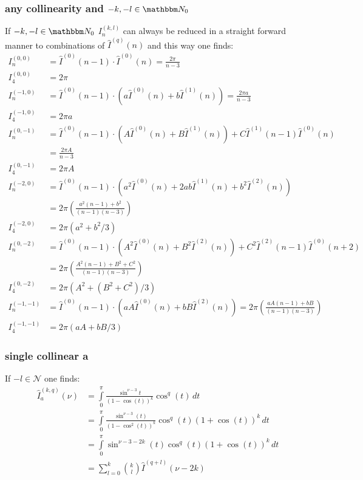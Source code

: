 \subsubsection{any collinearity and $-k,-l\in\mathbbm N_0$}
If $-k,-l\in\mathbbm N_0$ $I_{n}^{(k,l)}$ can always be reduced in a straight forward manner to combinations of $\hat I^{(q)}(n)$ and this way one finds\cite[Ch. 5]{Bojak:2000eu}\cite[App. C]{PhysRevD.40.54}:
\begin{align}
I^{(0,0)}_{n} &= \hat I^{(0)}(n-1) \cdot \hat I^{(0)}(n) = \frac{2\pi}{n-3}\\
I^{(0,0)}_{4} &= 2\pi\\
I^{(-1,0)}_{n} &= \hat I^{(0)}(n-1) \cdot (a\hat I^{(0)}(n)+b\hat I^{(1)}(n)) = \frac{2\pi a}{n-3}\\
I^{(-1,0)}_{4} &= 2\pi a \\
I^{(0,-1)}_{n} &= \hat I^{(0)}(n-1) \cdot (A\hat I^{(0)}(n) + B\hat I^{(1)}(n)) + C\hat I^{(1)}(n-1)\hat I^{(0)}(n)\\
 &= \frac{2\pi A}{n-3}\\
I^{(0,-1)}_{4} &=2\pi A\\
I^{(-2,0)}_{n} &= \hat I^{(0)}(n-1) \cdot (a^2\hat I^{(0)}(n)+2ab\hat I^{(1)}(n) + b^2 \hat I^{(2)}(n))\\
 &= 2\pi\left(\frac{a^2(n-1)+b^2}{(n-1)(n-3)}\right)\\
I^{(-2,0)}_{4} &= 2\pi(a^2 + b^2/3) \\
I^{(0,-2)}_{n} &= \hat I^{(0)}(n-1) \cdot (A^2\hat I^{(0)}(n) + B^2\hat I^{(2)}(n)) + C^2\hat I^{(2)}(n-1)\hat I^{(0)}(n+2) \\
 &= 2\pi\left(\frac{A^2(n-1)+B^2+C^2}{(n-1)(n-3)}\right)\\
I^{(0,-2)}_{4} &= 2\pi(A^2+(B^2+C^2)/3) \\
I^{(-1,-1)}_{n} &= \hat I^{(0)}(n-1) \cdot (a A\hat I^{(0)}(n) + b B \hat I^{(2)}(n)) = 2\pi\left(\frac{aA(n-1)+bB}{(n-1)(n-3)}\right)\\
I^{(-1,-1)}_{4} &= 2\pi(aA + bB/3)
\end{align}

\subsubsection{single collinear a}
If $-l\in\mathcal N$ one finds:
\begin{align}
\hat I_{a}^{(k,q)}(\nu) &= \int\limits_0^\pi\!\frac{\sin^{\nu-3}t}{(1-\cos(t))^k}\cos^q(t)\, dt \\
 &= \int\limits_0^\pi\!\frac{\sin^{\nu-3}(t)}{(1-\cos^2(t))^k}\cos^q(t)(1+\cos(t))^k\, dt\\
 &=\int\limits_0^\pi\!\sin^{\nu-3-2k}(t)\cos^q(t)(1+\cos(t))^k\, dt\\
 &= \sum\limits_{l=0}^k\binom{k}{l}\hat I^{(q+l)}(\nu-2k)
\end{align}

